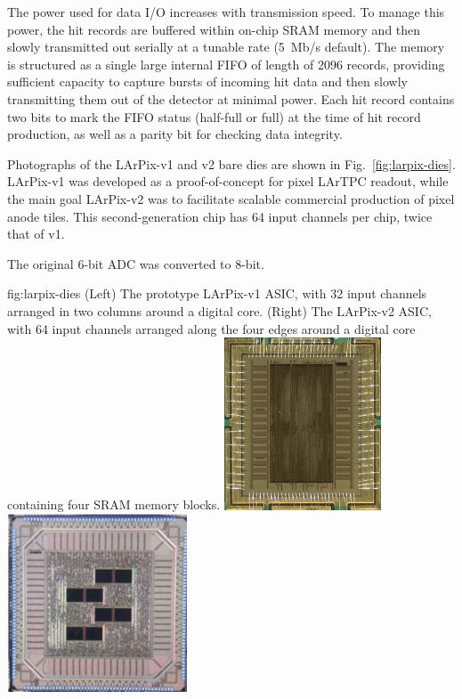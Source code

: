 The power used for data I/O increases with transmission speed.
To manage this power, the hit records are buffered within on-chip SRAM memory and then slowly transmitted out serially at a tunable rate (5~Mb/s default)\@.
The memory is structured as a single large internal FIFO of length of 2096 records, providing sufficient capacity to capture bursts of incoming hit data and then slowly transmitting them out of the detector at minimal power.
Each hit record contains two bits to mark the FIFO status (half-full or full) at the time of hit record production, as well as a parity bit for checking data integrity.

Photographs of the LArPix-v1 and v2 bare dies are shown in Fig.~\ref{fig:larpix-dies}.
LArPix-v1 was developed as a proof-of-concept for pixel LArTPC readout, while the main goal LArPix-v2 was to facilitate scalable commercial production of pixel anode tiles.
This second-generation chip has 64 input channels per chip, twice that of v1\@.

The original 6-bit ADC was converted to 8-bit\@.

\begin{dunefigure}{fig:larpix-dies}
{(Left) The prototype LArPix-v1 ASIC, with 32 input channels arranged in two columns around a digital core.  (Right) The LArPix-v2 ASIC, with 64 input channels arranged along the four edges around a digital core containing four SRAM memory blocks.}
\includegraphics[width=0.35\textwidth]{graphics/lartpc/Charge/larpix_v1_die.png}
\includegraphics[width=0.4\textwidth]{graphics/lartpc/Charge/larpix_v2_die.png}
\end{dunefigure}

